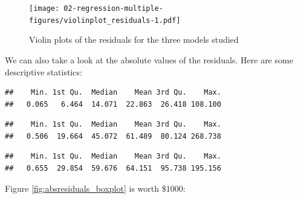 \documentclass[10pt,b5paper,krantz1]{krantz}
\newenvironment{Shaded}{\begin{snugshade}}{\end{snugshade}}
\newcommand{\KeywordTok}[1]{\textcolor[rgb]{0.27,0.27,0.27}{\textbf{#1}}}
\newcommand{\NormalTok}[1]{#1}
\newcommand{\OperatorTok}[1]{\textcolor[rgb]{0.43,0.43,0.43}{\textbf{#1}}}
\begin{document}
\begin{figure}
\hypertarget{fig:violinplot_residuals}{%
\centering
\texttt{[image: 02-regression-multiple-figures/violinplot\_residuals-1.pdf]}
\caption{Violin plots of the residuals for the three models studied}\label{fig:violinplot_residuals}
}
\end{figure}

We can also take a look at the absolute values of the residuals.
Here are some descriptive statistics:

\begin{Shaded}
\end{Shaded}

\begin{verbatim}
##    Min. 1st Qu.  Median    Mean 3rd Qu.    Max. 
##   0.065   6.464  14.071  22.863  26.418 108.100
\end{verbatim}

\begin{Shaded}
\end{Shaded}

\begin{verbatim}
##    Min. 1st Qu.  Median    Mean 3rd Qu.    Max. 
##   0.506  19.664  45.072  61.489  80.124 268.738
\end{verbatim}

\begin{Shaded}
\end{Shaded}

\begin{verbatim}
##    Min. 1st Qu.  Median    Mean 3rd Qu.    Max. 
##   0.655  29.854  59.676  64.151  95.738 195.156
\end{verbatim}

Figure \ref{fig:absresiduals_boxplot} is worth \$1000:
\end{document}
